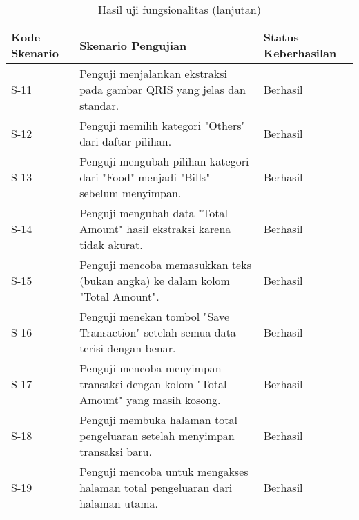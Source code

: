 \begin{table}[h!]
\ContinuedFloat
\caption{Hasil uji fungsionalitas (lanjutan)}
\begin{tabularx}{\linewidth}{|p{2cm}|X|p{3.5cm}|}
\hline
\textbf{Kode Skenario} & \textbf{Skenario Pengujian} & \textbf{Status Keberhasilan} \\
\hline
S-11 & Penguji menjalankan ekstraksi pada gambar QRIS yang jelas dan standar. & Berhasil \\
\hline
S-12 & Penguji memilih kategori "Others" dari daftar pilihan. & Berhasil \\
\hline
S-13 & Penguji mengubah pilihan kategori dari "Food" menjadi "Bills" sebelum menyimpan. & Berhasil \\
\hline
S-14 & Penguji mengubah data "Total Amount" hasil ekstraksi karena tidak akurat. & Berhasil \\
\hline
S-15 & Penguji mencoba memasukkan teks (bukan angka) ke dalam kolom "Total Amount". & Berhasil \\
\hline
S-16 & Penguji menekan tombol "Save Transaction" setelah semua data terisi dengan benar. & Berhasil \\
\hline
S-17 & Penguji mencoba menyimpan transaksi dengan kolom "Total Amount" yang masih kosong. & Berhasil \\
\hline
S-18 & Penguji membuka halaman total pengeluaran setelah menyimpan transaksi baru. & Berhasil \\
\hline
S-19 & Penguji mencoba untuk mengakses halaman total pengeluaran dari halaman utama. & Berhasil \\
\hline
\end{tabularx}
\end{table}
